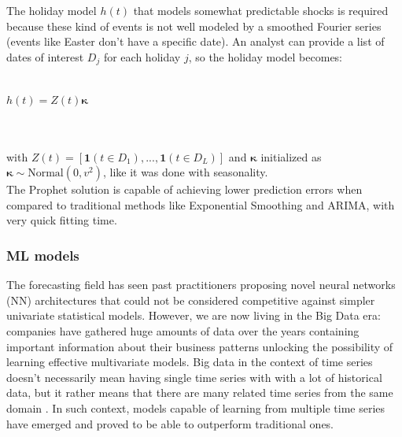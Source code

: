 \documentclass[a4paper]{article} %
\begin{document}
	The holiday model $h(t)$ that models somewhat predictable shocks is required because these kind of events is not well modeled by a smoothed Fourier series (events like Easter don't have a specific date). An analyst can provide a list of dates of interest $D_j$ for each holiday $j$, so the holiday model becomes:\\\\
	\centerline{$h(t) = Z(t) \pmb{\kappa}$}\\\\
	with $Z(t) = [ \mathbf{1} (t \in D_1), ..., \mathbf{1} (t \in D_L)] $ and $\pmb{\kappa}$ initialized as $\pmb{\kappa} \sim \text{Normal}(0, v^2)$, like it was done with seasonality.\\
	The Prophet solution is capable of achieving lower prediction errors when compared to traditional methods like Exponential Smoothing and ARIMA, with very quick fitting time.
	
	\subsubsection{ML models}
	The forecasting field has seen past practitioners proposing novel neural networks (NN) architectures that could not be considered competitive against simpler univariate statistical models. However, we are now living in the Big Data era: companies have gathered huge amounts of data over the years containing important information about their business patterns unlocking the possibility of learning effective multivariate models. Big data in the context of time series doesn't necessarily mean having single time series with with a lot of historical data, but it rather means that there are many related time series from the same domain \cite{RNNForecasting}. In such context, models capable of learning from multiple time series have emerged \cite{M5Competition} and proved to be able to outperform traditional ones.
	
\end{document}
